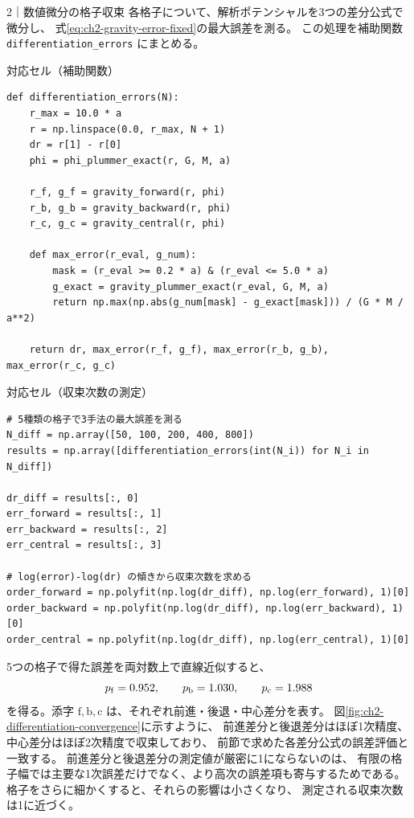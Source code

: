 \begin{notebookblock}{2｜数値微分の格子収束}
各格子について、解析ポテンシャルを3つの差分公式で微分し、
式\eqref{eq:ch2-gravity-error-fixed}の最大誤差を測る。
この処理を補助関数 \texttt{differentiation\_errors} にまとめる。

{\sffamily\small\color{graytext}対応セル（補助関数）}
\begin{Verbatim}[xleftmargin=2mm,fontsize=\small,frame=single,framesep=1.8mm,framerule=0.35pt,rulecolor=\color{listingframe},fillcolor=\color{listingbg}]
def differentiation_errors(N):
    r_max = 10.0 * a
    r = np.linspace(0.0, r_max, N + 1)
    dr = r[1] - r[0]
    phi = phi_plummer_exact(r, G, M, a)

    r_f, g_f = gravity_forward(r, phi)
    r_b, g_b = gravity_backward(r, phi)
    r_c, g_c = gravity_central(r, phi)

    def max_error(r_eval, g_num):
        mask = (r_eval >= 0.2 * a) & (r_eval <= 5.0 * a)
        g_exact = gravity_plummer_exact(r_eval, G, M, a)
        return np.max(np.abs(g_num[mask] - g_exact[mask])) / (G * M / a**2)

    return dr, max_error(r_f, g_f), max_error(r_b, g_b), max_error(r_c, g_c)
\end{Verbatim}

{\sffamily\small\color{graytext}対応セル（収束次数の測定）}
\begin{Verbatim}[xleftmargin=2mm,fontsize=\small,frame=single,framesep=1.8mm,framerule=0.35pt,rulecolor=\color{listingframe},fillcolor=\color{listingbg}]
# 5種類の格子で3手法の最大誤差を測る
N_diff = np.array([50, 100, 200, 400, 800])
results = np.array([differentiation_errors(int(N_i)) for N_i in N_diff])

dr_diff = results[:, 0]
err_forward = results[:, 1]
err_backward = results[:, 2]
err_central = results[:, 3]

# log(error)-log(dr) の傾きから収束次数を求める
order_forward = np.polyfit(np.log(dr_diff), np.log(err_forward), 1)[0]
order_backward = np.polyfit(np.log(dr_diff), np.log(err_backward), 1)[0]
order_central = np.polyfit(np.log(dr_diff), np.log(err_central), 1)[0]
\end{Verbatim}
\end{notebookblock}

5つの格子で得た誤差を両対数上で直線近似すると、
\begin{equation}
 p_{\rm f}=0.952,
 \qquad
 p_{\rm b}=1.030,
 \qquad
 p_{\rm c}=1.988
\label{eq:ch2-diff-orders}
\end{equation}
を得る。添字 $\mathrm f,\mathrm b,\mathrm c$ は、それぞれ前進・後退・中心差分を表す。
図\ref{fig:ch2-differentiation-convergence}に示すように、
前進差分と後退差分はほぼ1次精度、中心差分はほぼ2次精度で収束しており、
前節で求めた各差分公式の誤差評価と一致する。
前進差分と後退差分の測定値が厳密に1にならないのは、
有限の格子幅では主要な1次誤差だけでなく、より高次の誤差項も寄与するためである。
格子をさらに細かくすると、それらの影響は小さくなり、
測定される収束次数は1に近づく。

